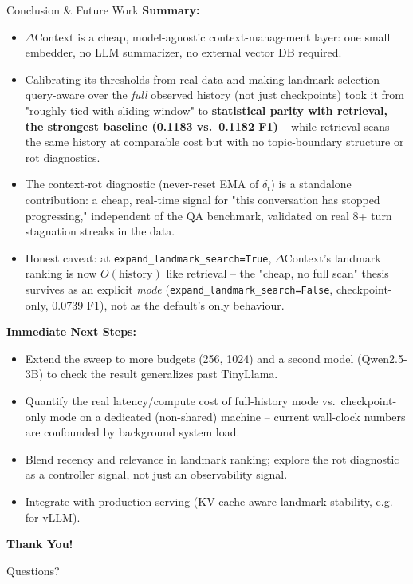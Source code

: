 \documentclass[aspectratio=169]{beamer}
\begin{document}
\begin{frame}{Conclusion \& Future Work}
    \textbf{Summary:}
    \begin{itemize}
        \item $\Delta$Context is a cheap, model-agnostic context-management layer: one small embedder, no LLM summarizer, no external vector DB required.
        \item Calibrating its thresholds from real data and making landmark selection query-aware over the \emph{full} observed history (not just checkpoints) took it from "roughly tied with sliding window" to \textbf{statistical parity with retrieval, the strongest baseline (0.1183 vs.\ 0.1182 F1)} -- while retrieval scans the same history at comparable cost but with no topic-boundary structure or rot diagnostics.
        \item The context-rot diagnostic (never-reset EMA of $\delta_t$) is a standalone contribution: a cheap, real-time signal for "this conversation has stopped progressing," independent of the QA benchmark, validated on real 8+ turn stagnation streaks in the data.
        \item Honest caveat: at \texttt{expand\_landmark\_search=True}, $\Delta$Context's landmark ranking is now $O(\text{history})$ like retrieval -- the "cheap, no full scan" thesis survives as an explicit \emph{mode} (\texttt{expand\_landmark\_search=False}, checkpoint-only, 0.0739 F1), not as the default's only behaviour.
    \end{itemize}

    \vspace{0.2cm}
    \textbf{Immediate Next Steps:}
    \begin{itemize}
        \item Extend the sweep to more budgets (256, 1024) and a second model (Qwen2.5-3B) to check the result generalizes past TinyLlama.
        \item Quantify the real latency/compute cost of full-history mode vs.\ checkpoint-only mode on a dedicated (non-shared) machine -- current wall-clock numbers are confounded by background system load.
        \item Blend recency and relevance in landmark ranking; explore the rot diagnostic as a controller signal, not just an observability signal.
        \item Integrate with production serving (KV-cache-aware landmark stability, e.g. for vLLM).
    \end{itemize}
\end{frame}

\begin{frame}
    \centering
    \Huge \textbf{Thank You!}

    \vspace{0.5cm}
    \large Questions?
\end{frame}
\end{document}
